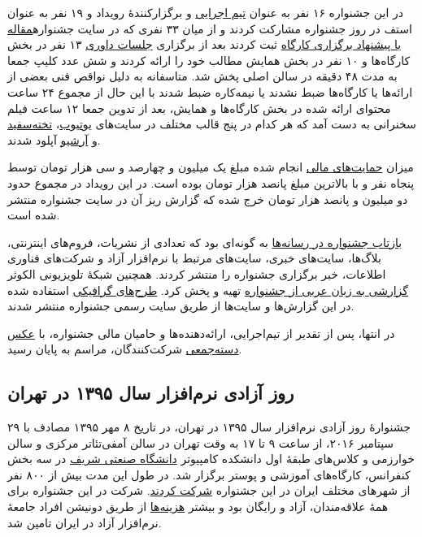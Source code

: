 \documentclass{article}
\begin{document}
{در این جشنواره ۱۶ نفر به عنوان \href{http://sfd.fsug.ir/1394/patronage/staff}{تیم اجرایی} و برگزارکنندهٔ رویداد و ۱۹ نفر به عنوان\hspace{100pt} استف در روز جشنواره مشارکت کردند و از میان ۳۳ نفری که در سایت جشنواره\newline \href{http://sfd.fsug.ir/1394/plan/articles}{مقاله یا پیشنهاد برگزاری کارگاه} ثبت کردند بعد از برگزاری \href{http://sfd.fsug.ir/1394/referee}{جلسات داوری} ۱۳ نفر در بخش کارگاه‌ها و ۱۰ نفر در بخش همایش مطالب خود را ارائه کردند و شش عدد کلیپ جمعا به مدت ۴۸ دقیقه در سالن اصلی پخش شد. متاسفانه به دلیل نواقص فنی بعضی از ارائه‌ها یا کارگاه‌ها ضبط نشدند یا نیمه‌کاره ضبط شدند با این حال از مجموع ۲۴ ساعت محتوای ارائه شده در بخش کارگاه‌ها و همایش، بعد از تدوین جمعا ۱۲ ساعت فیلم سخنرانی به دست آمد که هر کدام در پنج قالب مختلف در سایت‌های \href{https://www.youtube.com/channel/UCbhw92WI8GJZDdBMXn4ONXA?sub_confirmation=1}{یوتیوب}، \href{http://takhtesefid.org/user/freeknowledgefoundation}{تخته‌سفید} و \href{https://archive.org/search.php?query=subject%3A%22Free+Knowledge+Foundation%22}{آرشیو} آپلود شدند.

میزان \href{http://sfd.fsug.ir/1394/patronage/donation}{حمایت‌های مالی} انجام شده مبلغ یک میلیون و چهارصد و سی هزار تومان توسط پنجاه نفر و با بالاترین مبلغ پانصد هزار تومان بوده است. در این رویداد در مجموع حدود دو میلیون و پانصد هزار تومان خرج شده که گزارش ریز آن در سایت جشنواره منتشر شده است.


\href{http://sfd.fsug.ir/1394/in-media}{بازتاب جشنواره در رسانه‌ها} به گونه‌ای بود که تعدادی از نشریات، فروم‌های اینترنتی، بلاگ‌ها، سایت‌های خبری، سایت‌های مرتبط با نرم‌افزار آزاد و شرکت‌های فناوری اطلاعات، خبر برگزاری جشنواره را منتشر کردند. همچنین شبکهٔ تلویزیونی الکوثر \href{https://www.youtube.com/watch?v=pT-4Gc1Z4LQ}{گزارشی به زبان عربی از جشنواره} تهیه و پخش کرد. \href{http://sfd.fsug.ir/1394/artworks}{طرح‌های گرافیکی} استفاده شده در این گزارش‌ها و سایت‌ها از طریق سایت رسمی جشنواره منتشر شدند.

در انتها، پس از تقدیر از تیم‌اجرایی، ارائه‌دهنده‌ها و حامیان مالی جشنواره، با \href{http://sfd.fsug.ir/1394/photos}{عکس دسته‌جمعی} شرکت‌کنندگان، مراسم به پایان رسید.

\subsection{روز آزادی نرم‌افزار سال ۱۳۹۵ در تهران}
جشنوارهٔ روز آزادی نرم‌افزار سال ۱۳۹۵ در تهران، در تاریخ ۸ مهر ۱۳۹۵ مصادف با ۲۹ سپتامبر ۲۰۱۶، از ساعت ۹ تا ۱۷ به وقت تهران در سالن آمفی‌تئاتر مرکزی و سالن خوارزمی و کلاس‌های طبقهٔ اول دانشکده کامپیوتر \hspace{25pt} \href{http://sfd.fsug.ir/1395/directions}{دانشگاه صنعتی شریف} در سه بخش کنفرانس، کارگاه‌های آموزشی و پوستر برگزار شد. در طول این مدت بیش از ۸۰۰ نفر از شهرهای مختلف ایران در این جشنواره \href{http://sfd.fsug.ir/1395/about-us/participation}{شرکت کردند}. شرکت در این جشنواره برای همهٔ علاقه‌مندان، آزاد و رایگان بود و بیشتر \href{http://sfd.fsug.ir/1395/patronage/donation}{هزینه‌ها} از طریق دونیشن افراد جامعهٔ نرم‌افزار آزاد در ایران تامین شد.

}
\end{document}
